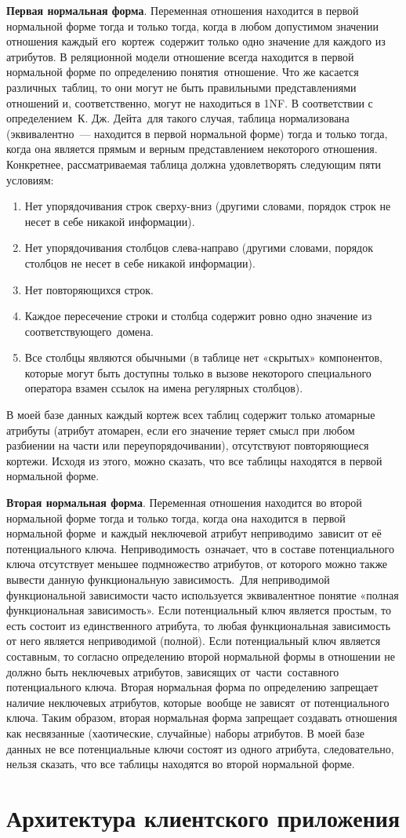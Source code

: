 \textbf{Первая нормальная форма}. Переменная отношения находится в первой нормальной форме тогда и только тогда, когда в любом допустимом значении отношения каждый его кортеж содержит только одно значение для каждого из атрибутов.
В реляционной модели отношение всегда находится в первой нормальной форме по определению понятия отношение.
Что же касается различных таблиц, то они могут не быть правильными представлениями отношений и, соответственно, могут не находиться в 1NF. В соответствии с определением К. Дж. Дейта для такого случая, таблица нормализована (эквивалентно — находится в первой нормальной форме) тогда и только тогда, когда она является прямым и верным представлением некоторого отношения. Конкретнее, рассматриваемая таблица должна удовлетворять следующим пяти условиям:
\begin{enumerate}
\item Нет упорядочивания строк сверху-вниз (другими словами, порядок строк не несет в себе никакой информации).
\item Нет упорядочивания столбцов слева-направо (другими словами, порядок столбцов не несет в себе никакой информации).
\item Нет повторяющихся строк.
\item Каждое пересечение строки и столбца содержит ровно одно значение из соответствующего домена.
\item Все столбцы являются обычными (в таблице нет «скрытых» компонентов, которые могут быть доступны только в вызове некоторого специального оператора взамен ссылок на имена регулярных столбцов).
\end{enumerate}
В моей базе данных каждый кортеж всех таблиц содержит только атомарные атрибуты (атрибут атомарен, если его значение теряет смысл при любом разбиении на части или переупорядочивании), отсутствуют повторяющиеся кортежи. Исходя из этого, можно сказать, что все таблицы находятся в первой нормальной форме.

\textbf{Вторая нормальная форма}. Переменная отношения находится во второй нормальной форме тогда и только тогда, когда она находится в первой нормальной форме и каждый неключевой атрибут неприводимо зависит от её потенциального ключа.
Неприводимость означает, что в составе потенциального ключа отсутствует меньшее подмножество атрибутов, от которого можно также вывести данную функциональную зависимость. Для неприводимой функциональной зависимости часто используется эквивалентное понятие «полная функциональная зависимость». Если потенциальный ключ является простым, то есть состоит из единственного атрибута, то любая функциональная зависимость от него является неприводимой (полной). Если потенциальный ключ является составным, то согласно определению второй нормальной формы в отношении не должно быть неключевых атрибутов, зависящих от части составного потенциального ключа.
Вторая нормальная форма по определению запрещает наличие неключевых атрибутов, которые вообще не зависят от потенциального ключа. Таким образом, вторая нормальная форма запрещает создавать отношения как несвязанные (хаотические, случайные) наборы атрибутов.
В моей базе данных не все потенциальные ключи состоят из одного атрибута, следовательно, нельзя сказать, что все таблицы находятся во второй нормальной форме.
\section{Архитектура клиентского приложения}

